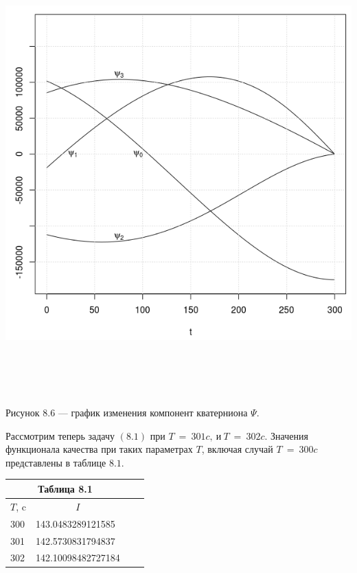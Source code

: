 \documentclass[14pt]{extreport}
\begin{document}
\begin{center}
\vspace*{50px}
\includegraphics[width=17cm, height=17cm]{p300.png}

Рисунок $8.6$ --- график изменения компонент кватерниона $\Psi$.
\end{center}

Рассмотрим теперь задачу $(8.1)$ при $T\ =\ 301c,\ и\ T\ =\ 302c$. Значения функционала качества при таких параметрах $T$, включая случай $T\ =\ 300c$
представлены в таблице $8.1$.

\begin{center}
   \begin{tabular}{ |l|l|l|l| }
   \multicolumn{2}{c}{Таблица 8.1}\\
    \hline
    \multicolumn{1}{|c|}{$T$, c} & \multicolumn{1}{c|}{$I$} \\ \hline
    300  & 143.0483289121585   \\ \hline
    301  & 142.5730831794837  \\ \hline
    302  & 142.10098482727184\\ \hline
    \end{tabular}             
\end{center}
\end{document}
